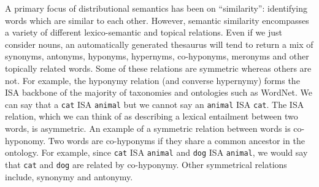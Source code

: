 \documentclass[11pt]{article}
\begin{document}
A primary focus of distributional semantics has been on ``similarity'': identifying words which are similar to each other. However, semantic similarity encompasses a variety of different lexico-semantic and topical relations.  Even if we just consider nouns, an automatically generated thesaurus will tend to return a mix of synonyms, antonyms, hyponyms, hypernyms, co-hyponyms, meronyms and other topically related words.  Some of these relations are symmetric whereas others are not.  For example, the hyponymy relation (and converse hypernymy) forms the ISA backbone of the majority of taxonomies and ontologies such as WordNet.  We can say that a \texttt{cat} ISA \texttt{animal}  but we cannot say an \texttt{animal} ISA \texttt{cat}.  The ISA relation, which we can think of  as describing a lexical entailment\cite{Geffet2005}  between two words, is asymmetric. An example of a symmetric relation between words is co-hyponomy. Two words are co-hyponyms if they share a common ancestor in the ontology. 
For example, since \texttt{cat} ISA \texttt{animal} and \texttt{dog} ISA \texttt{animal}, we would say that \texttt{cat} and \texttt{dog} are related by co-hyponymy.  Other symmetrical relations include, synonymy and antonymy. 
\end{document}
